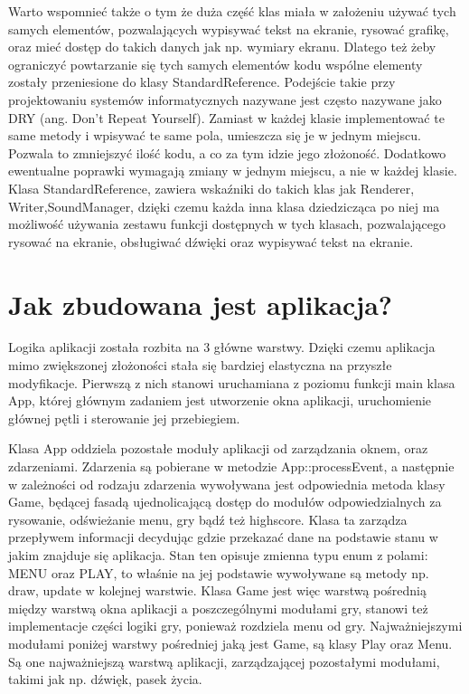 Warto wspomnieć także o tym że duża część klas miała w założeniu używać tych samych elementów, pozwalających wypisywać tekst na ekranie, rysować grafikę, oraz mieć dostęp do takich danych jak np. wymiary ekranu. Dlatego też żeby ograniczyć powtarzanie się tych samych elementów kodu wspólne elementy zostały przeniesione do klasy StandardReference. Podejście takie przy projektowaniu systemów informatycznych nazywane jest często nazywane jako DRY (ang. Don't Repeat Yourself). Zamiast w każdej klasie implementować te same metody i wpisywać te same pola, umieszcza się je w jednym miejscu. Pozwala to zmniejszyć ilość kodu, a co za tym idzie jego złożoność. Dodatkowo ewentualne poprawki wymagają zmiany w jednym miejscu, a nie w każdej klasie. Klasa StandardReference, zawiera wskaźniki do takich klas jak Renderer, Writer,SoundManager, dzięki czemu każda inna klasa dziedzicząca po niej ma możliwość używania zestawu funkcji dostępnych w tych klasach, pozwalającego rysować na ekranie, obsługiwać dźwięki oraz wypisywać tekst na ekranie.

\section{Jak zbudowana jest aplikacja?}

Logika aplikacji została rozbita na 3 główne warstwy. Dzięki czemu aplikacja mimo zwiększonej złożoności stała się bardziej elastyczna na przyszłe modyfikacje.  Pierwszą z nich stanowi uruchamiana z poziomu funkcji main klasa App, której głównym zadaniem jest utworzenie okna aplikacji, uruchomienie głównej pętli i sterowanie jej przebiegiem.

Klasa App oddziela pozostałe moduły aplikacji od zarządzania oknem, oraz zdarzeniami. Zdarzenia są pobierane w metodzie App::processEvent, a następnie w zależności od rodzaju zdarzenia wywoływana jest odpowiednia metoda klasy Game, będącej fasadą ujednolicającą dostęp do modułów odpowiedzialnych za rysowanie, odświeżanie menu, gry bądź też highscore. Klasa ta zarządza przepływem informacji decydując gdzie przekazać dane na podstawie stanu w jakim znajduje się aplikacja. Stan ten opisuje zmienna typu enum z polami: MENU oraz PLAY, to właśnie na jej podstawie wywoływane są metody np. draw, update w kolejnej warstwie. Klasa Game jest więc warstwą pośrednią między warstwą okna aplikacji a poszczególnymi modułami gry, stanowi też implementacje części logiki gry, ponieważ rozdziela menu od gry. Najważniejszymi modułami poniżej warstwy pośredniej jaką jest Game, są klasy Play oraz Menu. Są one najważniejszą warstwą aplikacji, zarządzającej pozostałymi modułami, takimi jak np. dźwięk, pasek życia.

